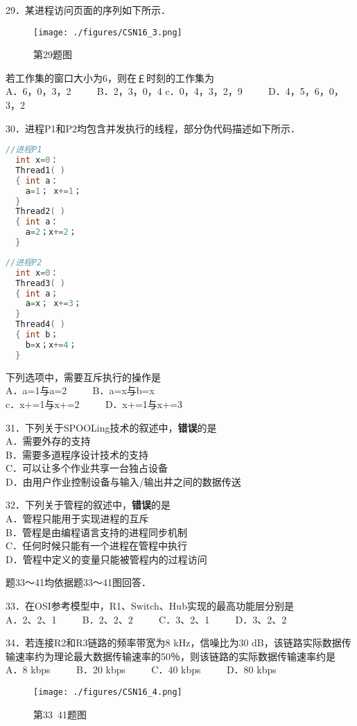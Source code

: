 29．某进程访问页面的序列如下所示．
\begin{figure}[ht]
\centering
\texttt{[image: ./figures/CSN16\_3.png]}
\caption{第29题图} \label{CSN16_fig3}
\end{figure}
若工作集的窗口大小为6，则在￡时刻的工作集为 \\
A．{6，0，3，2} $\qquad$ B．{2，3，0，4}
c．{0，4，3，2，9} $\qquad$ D．{4，5，6，0，3，2}

30．进程P1和P2均包含并发执行的线程，部分伪代码描述如下所示． \\
\begin{lstlisting}[language=cpp]
//进程P1
  int x=0：
  Thread1( )
  { int a：
    a=1； x+=1；
  }
  Thread2( )
  { int a：
    a=2；x+=2；
  }
\end{lstlisting}

\begin{lstlisting}[language=cpp]
//进程P2
  int x=0：
  Thread3( )
  { int a；
    a=x； x+=3；
  }
  Thread4( )
  { int b；
    b=x；x+=4；
  }
\end{lstlisting}
下列选项中，需要互斥执行的操作是 \\
A．a=1与a=2 $\qquad$ B．a=x与b=x \\
c．x+=1与x+=2 $\qquad$ D．x+=1与x+=3

31．下列关于SPOOLing技术的叙述中，\textbf{错误}的是 \\
A．需要外存的支持 \\
B．需要多道程序设计技术的支持 \\
C．可以让多个作业共享一台独占设备 \\
D．由用户作业控制设备与输入/输出井之间的数据传送

32．下列关于管程的叙述中，\textbf{错误}的是 \\
A．管程只能用于实现进程的互斥 \\
B．管程是由编程语言支持的进程同步机制 \\
C．任何时候只能有一个进程在管程中执行 \\
D．管程中定义的变量只能被管程内的过程访问

题33～41均依据题33～41图回答．

33．在OSI参考模型中，R1、Switch、Hub实现的最高功能层分别是 \\
A．2、2、1 $\qquad$ B．2、2、2 $\qquad$ C．3、2、1 $\qquad$ D．3、2、2

34．若连接R2和R3链路的频率带宽为8 kHz，信噪比为30 dB，该链路实际数据传输速率约为理论最大数据传输速率的50％，则该链路的实际数据传输速率约是 \\
A．8 kbps $\qquad$ B．20 kbps $\qquad$ C．40 kbps $\qquad$ D．80 kbps
\begin{figure}[ht]
\centering
\texttt{[image: ./figures/CSN16\_4.png]}
\caption{第33~41题图} \label{CSN16_fig4}
\end{figure}

